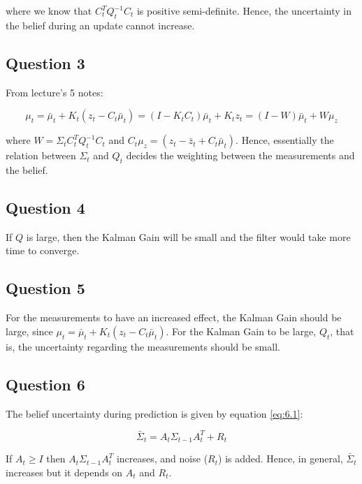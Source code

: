 	where we know that $C_t^T Q_t^{-1}C_t$ is positive semi-definite. Hence, the uncertainty in the belief during an update
	cannot increase.
	

\subsection{Question 3}

	From lecture's 5 notes:
	
	\begin{equation}
		\mu_t = \bar{\mu}_t + K_t (z_t - C_t \bar{\mu}_t) = (I - K_t C_t) \bar{\mu}_t  + K_t z_t = (I - W) \bar{\mu}_t + W \mu_{z}
	\end{equation}
	
	where $W = \Sigma_t C_t^T Q_t^{-1} C_t$ and $C_t \mu_z = (z_t - \bar{z}_t + C_t \bar{\mu}_t)$. Hence, essentially the relation 
	between $\Sigma_t$ and $Q_t$ decides the weighting between the measurements and the belief.
	
	
\subsection{Question 4}

	If $Q$ is large, then the Kalman Gain will be small and the filter would take more time to converge.
	
	
\subsection{Question 5}

	For the measurements to have an increased effect, the Kalman Gain should be large, 
	since $\mu_t = \bar{\mu}_t + K_t (z_t - C_t \bar{\mu}_t)$. For the Kalman Gain to be large, $Q_t$, that is, the
	uncertainty regarding the measurements should be small.
	
	
\subsection{Question 6}

	The belief uncertainty during prediction is given by equation \ref{eq:6.1}:
	
	\begin{equation}
		\bar{\Sigma}_t = A_t \Sigma_{t-1} A_t^T + R_t
		\label{eq:6.1}
	\end{equation}
	
	If $A_t \geq I$ then $A_t \Sigma_{t-1} A_t^T$ increases, and noise ($R_t$) is added. 
	Hence, in general, $\bar{\Sigma}_t$ increases but it depends on $A_t$ and $R_t$.
	
